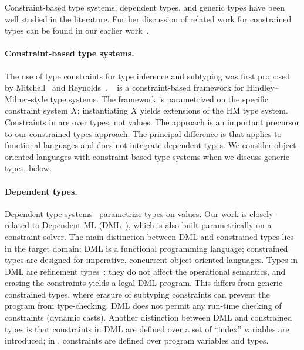 Constraint-based type systems, dependent types, and generic types
have been well studied in the literature.
Further discussion of
related work for constrained types can be found in our earlier
work~\cite{constrained-types}.

\paragraph{Constraint-based type systems.}

The use of type constraints for type inference and subtyping was
first proposed by
Mitchell~\cite{mitchell84} and 
Reynolds~\cite{reynolds85}.  
\hmx~\cite{sulzmann97type} is a constraint-based framework for
Hindley--Milner-style type systems.  The framework is parametrized on
the specific constraint system $X$; instantiating $X$ yields
extensions of the HM type system.  Constraints in \hmx{} are over
types, not values. The \hmx{} approach is an important precursor to
our constrained types approach. The principal difference is that
\hmx{} applies to functional languages and does not integrate
dependent types.
We consider object-oriented languages with constraint-based type systems when 
we discuss generic types, below.

\paragraph{Dependent types.}

Dependent type
systems~\cite{xi99dependent,epigram,cayenne}
param\-etrize types on values.
Our work is closely related to Dependent ML (DML~\cite{xi99dependent}), which
is also built
parametrically on a constraint solver.
The main distinction between DML and constrained types
lies in the target
domain: DML is a functional programming language;
constrained types are designed for imperative, concurrent
object-oriented languages. 
Types in DML are refinement types~\cite{refinement-types}:
they do not affect the operational semantics, and erasing the
constraints yields a legal DML program.  This differs from
generic constrained
types, where erasure of subtyping constraints can prevent the program from
type-checking.
DML does not permit any run-time checking of constraints
(dynamic casts).
Another distinction between DML and constrained types
is that constraints in DML are
defined over a set of ``index'' variables are introduced; in \Xten, constraints
are defined over program variables and types.


